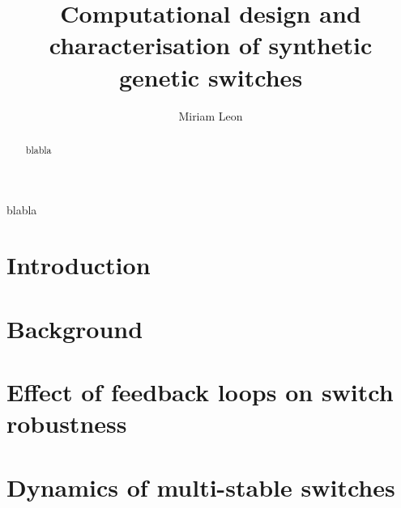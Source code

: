 \documentclass[]{phdthesis}
\title{Computational design and\\[0.2em]characterisation of synthetic\\[0.2em] genetic switches}
\author{Miriam Leon}
\begin{document}
\maketitle


\begin{abstract}
blabla
\end{abstract}

\tableofcontents*
\listoffigures
\listoftables
{}

\printglossary[type=\acronymtype, title=Abbreviations, toctitle=List of abbreviations]


\begin{acknowledgements}
blabla
\end{acknowledgements}


\mainmatter*
\chapter{Introduction}


\mainmatter*
\chapter{Background}
\label{ch:backg}


\mainmatter*
\chapter{Effect of feedback loops on switch robustness }
\label{ch:abcsysbio}



\mainmatter*
 
\chapter{Dynamics of multi-stable switches}
\label{ch:SF}

%
%
%
%
%
\end{document}
